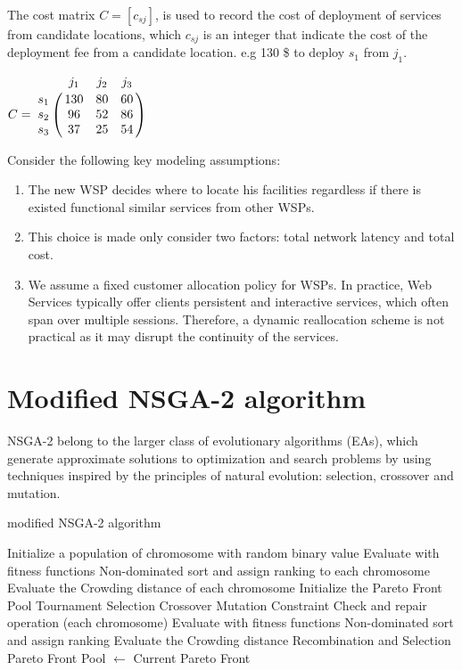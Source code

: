 \documentclass[twoside]{article}
\let\bbordermatrix\bordermatrix
\begin{document}
The cost matrix $C = [c_{sj}]$, is used to record the cost of deployment of services from candidate locations, 
which $c_{sj}$ is an integer that indicate the cost of the deployment fee from a candidate location. 
e.g 130 \$ to deploy $s_{1}$ from $j_{1}$.
\begin{center}
$
C = \bbordermatrix{~ & j_{1} & j_{2} & j_{3}\cr
					s_{1}	&130 &80 &60\cr
					s_{2}	&96  &52 &86\cr
					s_{3}	&37 &25 &54\cr} 
$
\end{center}

Consider the following key modeling assumptions:
\begin{enumerate}
	\item The new WSP decides where to locate his facilities regardless if there is existed functional similar services from other WSPs.
	\item This choice is made only consider two factors: total network latency and total cost.
	\item We assume a fixed customer allocation policy for WSPs. In practice, Web Services typically offer clients persistent and interactive services, which often span over multiple sessions. Therefore, a dynamic reallocation scheme is not practical as it may disrupt the continuity of the services.
\end{enumerate}

\section{Modified NSGA-2 algorithm}
NSGA-2 belong to the larger class of evolutionary algorithms (EAs), which generate approximate solutions to 
optimization and search problems by using techniques inspired by the principles of natural 
evolution: selection, crossover and mutation.

\begin{algorithm}
	\caption{modified NSGA-2 algorithm}
	\label{NSGA2}
	\begin{algorithmic}[1]
		\State Initialize a population of chromosome with random binary value
		\State Evaluate with fitness functions
		\State Non-dominated sort and assign ranking to each chromosome
		\State Evaluate the Crowding distance of each chromosome
		\State Initialize the Pareto Front Pool
		\State Tournament Selection
		\State Crossover 
		\State Mutation
		\State Constraint Check and repair operation
		\For(each chromosome)
		\State Evaluate with fitness functions
		\EndIf
		\State Non-dominated sort and assign ranking
		\State Evaluate the Crowding distance
		\EndFor
		\State Recombination and Selection
		\State Pareto Front Pool $\leftarrow$ Current Pareto Front
		\EndWhile
	\end{algorithmic}
\end{algorithm}
\end{document}
